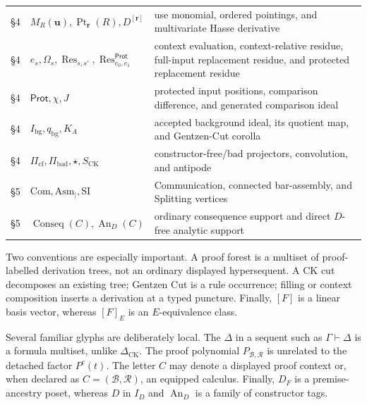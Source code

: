 \documentclass[10pt,a4paper]{article}
\theoremstyle{plain}
\theoremstyle{definition}
\theoremstyle{remark}
\newcommand{\Base}{\mathcal B}
\newcommand{\Rules}{\mathcal R}
\newcommand{\DeltaCK}{\Delta_{\mathrm{CK}}}
\newcommand{\ms}{\mathrel{\vdash}}
\begin{document}
\begin{longtable}{@{}L{1.35cm}L{4.15cm}L{9.55cm}@{}}
\S4 & \(M_R(\mathbf u),\operatorname{Pt}_{\mathbf r}(R),D^{[\mathbf r]}\) & use monomial, ordered pointings, and multivariate Hasse derivative\\
\S4 & \(e_s,\Omega_s,\operatorname{Res}_{s,s'},\operatorname{Res}^{\mathsf{Prot}}_{e_0,e_1}\) & context evaluation, context-relative residue, full-input replacement residue, and protected replacement residue\\
\S4 & \(\mathsf{Prot},\chi,J\) & protected input positions, comparison difference, and generated comparison ideal\\
\S4 & \(I_{\mathrm{bg}},q_{\mathrm{bg}},K_A\) & accepted background ideal, its quotient map, and Gentzen-Cut corolla\\
\S4 & \(\Pi_{\mathrm{cf}},\Pi_{\mathrm{bad}},\star,S_{\mathrm{CK}}\) & constructor-free/bad projectors, convolution, and antipode\\
\S5 & \(\mathrm{Com},\mathrm{Asm}_{\mid},\mathrm{SI}\) & Communication, connected bar-assembly, and Splitting vertices\\
\S5 & \(\operatorname{Conseq}(C),\operatorname{An}_D(C)\) & ordinary consequence support and direct \(D\)-free analytic support\\
\end{longtable}
\endgroup

Two conventions are especially important.  A proof forest is a multiset of
proof-labelled derivation trees, not an ordinary displayed hypersequent.
A CK cut decomposes an existing tree; Gentzen Cut is a rule occurrence;
filling or context composition inserts a derivation at a typed puncture.
Finally, \([F]\) is a linear basis vector, whereas \([F]_E\) is an
\(E\)-equivalence class.

Several familiar glyphs are deliberately local.  The \(\Delta\) in a
sequent such as \(\Gamma\ms\Delta\) is a formula multiset, unlike
\(\DeltaCK\).  The proof polynomial \(P_{\Base,\Rules}\) is unrelated to
the detached factor \(P^c(t)\).  The letter \(C\) may denote a displayed
proof context or, when declared as \(C=(\Base,\Rules)\), an equipped
calculus.  Finally, \(D_F\) is a premise-ancestry poset, whereas \(D\) in
\(I_D\) and \(\operatorname{An}_D\) is a family of constructor tags.
\end{document}
